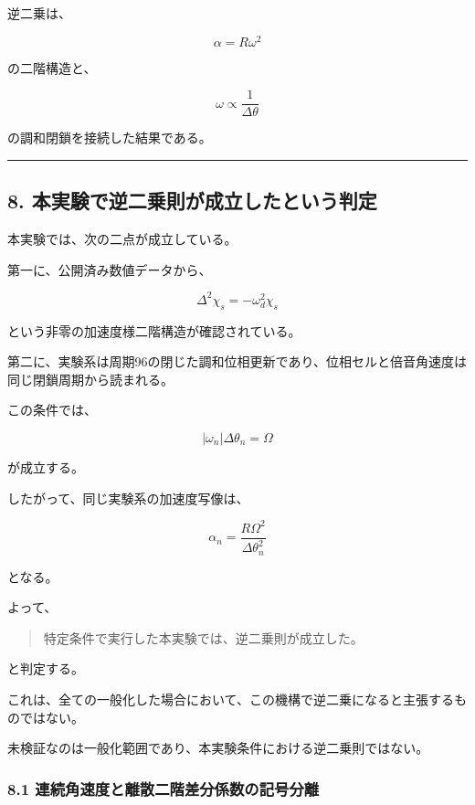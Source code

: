 \documentclass[
  a4paper,
]{ltjsarticle}
\begin{document}
逆二乗は、

\[
\alpha=R\omega^2
\]

の二階構造と、

\[
\omega\propto\frac{1}{\Delta\theta}
\]

の調和閉鎖を接続した結果である。

\begin{center}\rule{0.5\linewidth}{0.5pt}\end{center}

\subsection{8.
本実験で逆二乗則が成立したという判定}\label{ux672cux5b9fux9a13ux3067ux9006ux4e8cux4e57ux5247ux304cux6210ux7acbux3057ux305fux3068ux3044ux3046ux5224ux5b9a}

本実験では、次の二点が成立している。

第一に、公開済み数値データから、

\[
\Delta^2\chi_s
=-\omega_d^2\chi_s
\]

という非零の加速度様二階構造が確認されている。

第二に、実験系は周期96の閉じた調和位相更新であり、位相セルと倍音角速度は同じ閉鎖周期から読まれる。

この条件では、

\[
|\omega_n|\Delta\theta_n=\Omega
\]

が成立する。

したがって、同じ実験系の加速度写像は、

\[
\alpha_n
=\frac{R\Omega^2}{\Delta\theta_n^2}
\]

となる。

よって、

\begin{quote}
特定条件で実行した本実験では、逆二乗則が成立した。
\end{quote}

と判定する。

これは、全ての一般化した場合において、この機構で逆二乗になると主張するものではない。

未検証なのは一般化範囲であり、本実験条件における逆二乗則ではない。

\subsubsection{8.1
連続角速度と離散二階差分係数の記号分離}\label{ux9023ux7d9aux89d2ux901fux5ea6ux3068ux96e2ux6563ux4e8cux968eux5deeux5206ux4fc2ux6570ux306eux8a18ux53f7ux5206ux96e2}
\end{document}
